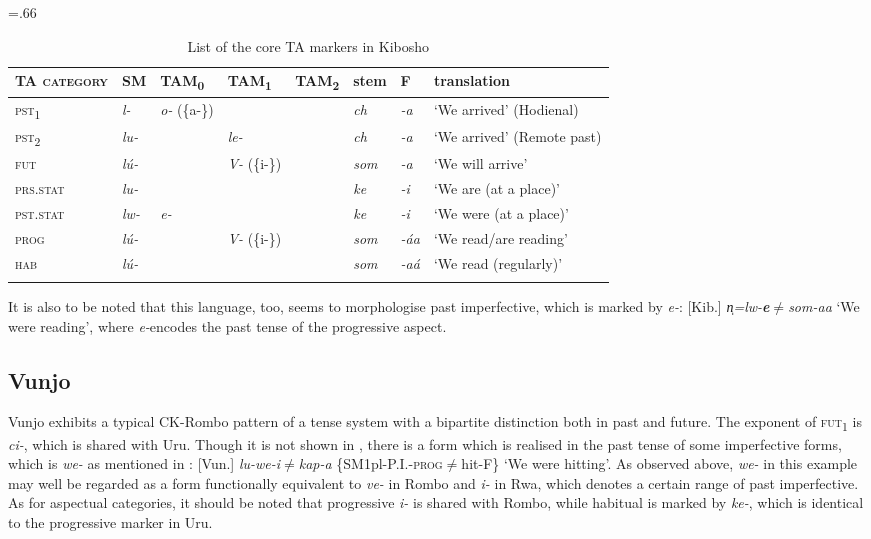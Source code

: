 \documentclass[output=paper]{langscibook}
\begin{document}
\begin{table}
\small\tabcolsep=.66\tabcolsep
\begin{tabularx}{\textwidth}{>{\scshape}lllllllQ}
\lsptoprule
{\normalfont TA category} & SM & {TAM\textsubscript{0}} & {TAM\textsubscript{1}} & {TAM\textsubscript{2}} & stem & F & translation\\\midrule
pst\textsubscript{1} & {\itshape l-} & {\textit{o-} (\{a-\})} &  &  & {\itshape ch} & {\itshape {}-a} & `We arrived' (Hodienal)\\
pst\textsubscript{2} & {\itshape lu-} &  & {\itshape le-} &  & {\itshape ch} & {\itshape {}-a} & {`We arrived' (Remote past)}\\
fut                  & {\itshape lú-} &  & {\textit{V-} (\{i-\})} &  & {\itshape som} & {\itshape {}-a} & `We will arrive'\\
prs.stat             & {\itshape lu-} &  &  &  & {\itshape ke} & {\itshape {}-i} & `We are (at a place)'\\
pst.stat             & {\itshape lw-} & {\itshape e-} &  &  & {\itshape ke} & {\itshape {}-i} & `We were (at a place)'\\
prog                 & {\itshape lú-} &  & {\textit{V-} (\{i-\})} &  & {\itshape som} & {\itshape {}-áa} & `We read/are reading'\\
hab                  & {\textit{lú-}} &  &  &  & {\textit{som}} & {\textit{{}-aá}} & `We read (regularly)'\\
\lspbottomrule
\end{tabularx}
\caption{List of the core TA markers in Kibosho}
\label{tab:shinagawa:6}
\end{table}

It is also to be noted that this language, too, seems to morphologise past imperfective, which is marked by \textit{e-}: [Kib.] \textit{n̩=lw-}\textbf{\textit{e}}\textit{${\neq}$som-aa} `We were reading', where \textit{e-}encodes the past tense of the progressive aspect.

\subsection{Vunjo \citep{Nurse2003a}}\label{sec:shinagawa:2.7}

Vunjo exhibits a typical CK-Rombo pattern of a tense system with a bipartite distinction both in past and future. The exponent of \textsc{fut}\textsubscript{1} is \textit{ci-}, which is shared with Uru. Though it is not shown in , there is a form which is realised in the past tense of some imperfective forms, which is \textit{we-} as mentioned in : [Vun.] \textit{lu-we-i${\neq}$kap-a} \{SM1pl-P.I.-\textsc{prog}${\neq}$hit-F\} `We were hitting'. As observed above, \textit{we-} in this example may well be regarded as a form functionally equivalent to \textit{ve-} in Rombo and \textit{i-} in Rwa, which denotes a certain range of past imperfective. As for aspectual categories, it should be noted that progressive \textit{i-} is shared with Rombo, while habitual is marked by \textit{ke-}, which is identical to the progressive marker in Uru.
\end{document}
